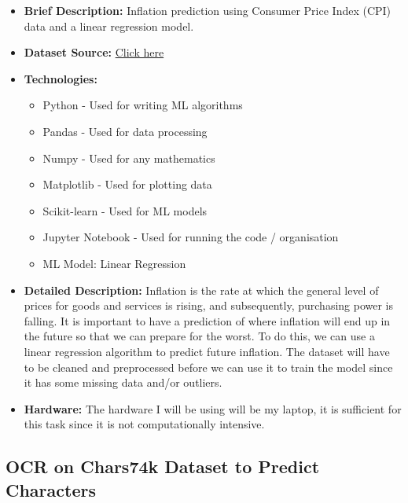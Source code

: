 \documentclass{article}
\begin{document}
\begin{itemize}
    \item \textbf{Brief Description:} Inflation prediction using Consumer Price Index (CPI) data and a linear regression model. 
    \item \textbf{Dataset Source:} \href{https://data.gov.ie/dataset/cpm03-consumer-price-index}{Click here}
    \item \textbf{Technologies:}
    \begin{itemize}
        \item Python - Used for writing ML algorithms
        \item Pandas - Used for data processing
        \item Numpy - Used for any mathematics
        \item Matplotlib - Used for plotting data
        \item Scikit-learn - Used for ML models
        \item Jupyter Notebook - Used for running the code / organisation
        \item ML Model: Linear Regression
    \end{itemize}
    \item \textbf{Detailed Description:} Inflation is the rate at which the general level of prices for goods and services is rising, and subsequently, purchasing power is falling. 
    It is important to have a prediction of where inflation will end up in the future so that we can prepare for the worst. To do this, we can use a linear regression algorithm to predict future inflation.
    The dataset will have to be cleaned and preprocessed before we can use it to train the model since it has some missing data and/or outliers.
    \item \textbf{Hardware:} The hardware I will be using will be my laptop, it is sufficient for this task since it is not computationally intensive.
\end{itemize}

\subsection{OCR on Chars74k Dataset to Predict Characters}
\end{document}
